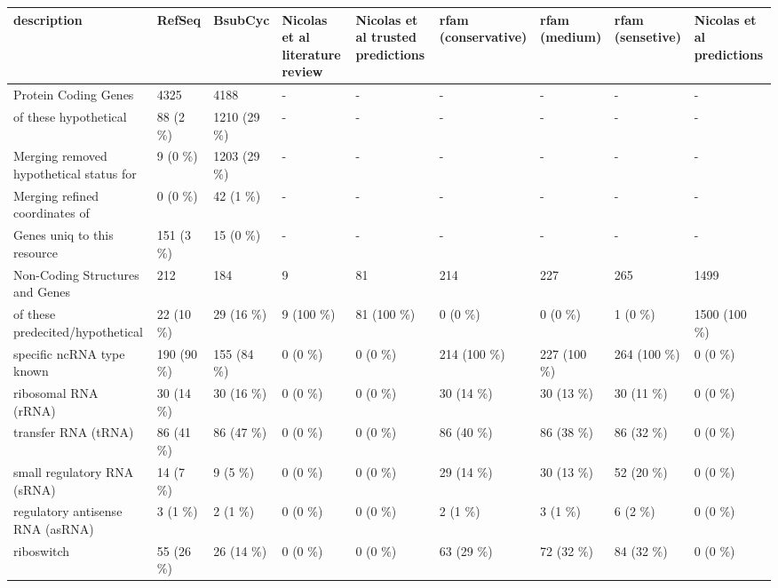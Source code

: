 \begin{table}[H]
\centering
\begin{tabular}{lllllllll}
\toprule
description & RefSeq & BsubCyc & Nicolas et al literature review & Nicolas et al trusted predictions & rfam (conservative) & rfam (medium) & rfam (sensetive) & Nicolas et al predictions\\
\midrule
Protein Coding Genes & 4325 & 4188 & - & - & - & - & - & -\\
\hspace{1em}of these hypothetical & 88 (2 \%) & 1210 (29 \%) & - & - & - & - & - & -\\
Merging removed hypothetical status for & 9 (0 \%) & 1203 (29 \%) & - & - & - & - & - & -\\
Merging refined coordinates of & 0 (0 \%) & 42 (1 \%) & - & - & - & - & - & -\\
Genes uniq to this resource & 151 (3 \%) & 15 (0 \%) & - & - & - & - & - & -\\
\hline
Non-Coding Structures and Genes & 212 & 184 & 9 & 81 & 214 & 227 & 265 & 1499\\
\hspace{1em}of these predecited/hypothetical & 22 (10 \%) & 29 (16 \%) & 9 (100 \%) & 81 (100 \%) & 0 (0 \%) & 0 (0 \%) & 1 (0 \%) & 1500 (100 \%)\\
specific ncRNA type known & 190 (90 \%) & 155 (84 \%) & 0 (0 \%) & 0 (0 \%) & 214 (100 \%) & 227 (100 \%) & 264 (100 \%) & 0 (0 \%)\\
\hspace{1em}ribosomal RNA (rRNA) & 30 (14 \%) & 30 (16 \%) & 0 (0 \%) & 0 (0 \%) & 30 (14 \%) & 30 (13 \%) & 30 (11 \%) & 0 (0 \%)\\
\hspace{1em}transfer RNA (tRNA) & 86 (41 \%) & 86 (47 \%) & 0 (0 \%) & 0 (0 \%) & 86 (40 \%) & 86 (38 \%) & 86 (32 \%) & 0 (0 \%)\\
\hspace{1em}small regulatory RNA (sRNA) & 14 (7 \%) & 9 (5 \%) & 0 (0 \%) & 0 (0 \%) & 29 (14 \%) & 30 (13 \%) & 52 (20 \%) & 0 (0 \%)\\
\hspace{1em}regulatory antisense RNA (asRNA) & 3 (1 \%) & 2 (1 \%) & 0 (0 \%) & 0 (0 \%) & 2 (1 \%) & 3 (1 \%) & 6 (2 \%) & 0 (0 \%)\\
\hspace{1em}riboswitch & 55 (26 \%) & 26 (14 \%) & 0 (0 \%) & 0 (0 \%) & 63 (29 \%) & 72 (32 \%) & 84 (32 \%) & 0 (0 \%)\\

\end{tabular}
\end{table}
